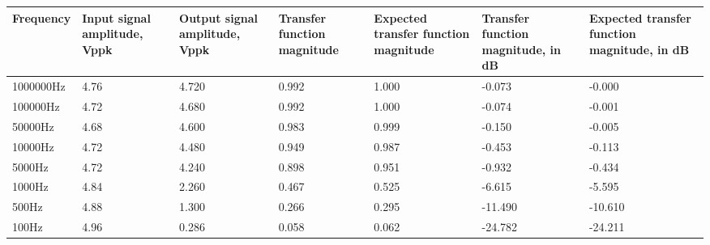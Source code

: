 \begin{table}[!h]
\begin{center}
\begin{tabular}{|p{2cm}|p{2cm}|p{2cm}|p{2cm}|p{2cm}|p{2cm}|p{2cm}|}
\hline
Frequency & Input signal amplitude, Vppk & Output signal amplitude, Vppk & Transfer function magnitude & Expected transfer function magnitude & Transfer function magnitude, in dB & Expected transfer function magnitude, in dB \\
\hline
1000000Hz	&	4.76	&	4.720	&	0.992	&	1.000	&	-0.073	&	-0.000	\\
\hline
100000Hz	&	4.72	&	4.680	&	0.992	&	1.000	&	-0.074	&	-0.001	\\
\hline
50000Hz	&	4.68	&	4.600	&	0.983	&	0.999	&	-0.150	&	-0.005	\\
\hline
10000Hz	&	4.72	&	4.480	&	0.949	&	0.987	&	-0.453	&	-0.113	\\
\hline
5000Hz	&	4.72	&	4.240	&	0.898	&	0.951	&	-0.932	&	-0.434	\\
\hline
1000Hz	&	4.84	&	2.260	&	0.467	&	0.525	&	-6.615	&	-5.595	\\
\hline
500Hz	&	4.88	&	1.300	&	0.266	&	0.295	&	-11.490	&	-10.610	\\
\hline
100Hz	&	4.96	&	0.286	&	0.058	&	0.062	&	-24.782	&	-24.211	\\
\hline
\end{tabular}
\label{tab-high}
\end{center}
\end{table}
